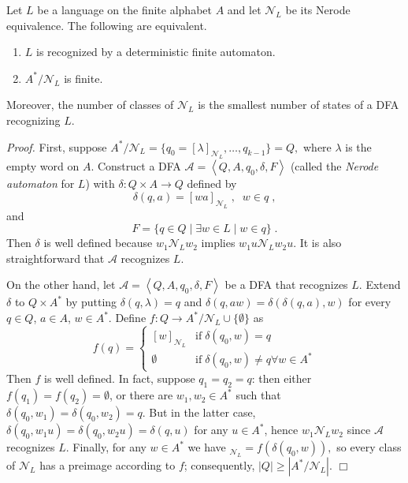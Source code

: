 \documentclass[12pt]{article}
\begin{document}
Let $L$ be a language on the finite alphabet $A$
and let $\mathcal{N}_L$ be its Nerode equivalence.
The following are equivalent.
\begin{enumerate}
\item
$L$ is recognized by a deterministic finite automaton.
\item
$A^\ast/\mathcal{N}_L$ is finite.
\end{enumerate}
Moreover, the number of classes of $\mathcal{N}_L$
is the smallest number of states of a DFA recognizing $L$.

\textit{Proof.}
First, suppose
\begin{math}
A^\ast/\mathcal{N}_L=\{q_0=[\lambda]_{\mathcal{N}_L},\ldots,q_{k-1}\}=Q,
\end{math}
where $\lambda$ is the empty word on $A$.
Construct a DFA $\mathcal{A}=\left<Q,A,q_0,\delta,F\right>$
(called the \emph{Nerode automaton} for $L$)
with $\delta:Q\times A\to Q$ defined by
\begin{equation} \label{eq:map}
\delta(q,a)=[wa]_{\mathcal{N}_L}\;,\;\;w\in q\;,
\end{equation}
and
\begin{equation} \label{eq:final}
F=\{q\in Q\mid\exists w\in L\mid w\in q\}\;.
\end{equation}
Then $\delta$ is well defined
because $w_1\mathcal{N}_Lw_2$ implies $w_1u\mathcal{N}_Lw_2u$.
It is also straightforward that $\mathcal{A}$ recognizes $L$.

On the other hand,
let $\mathcal{A}=\left<Q,A,q_0,\delta,F\right>$
be a DFA that recognizes $L$.
Extend $\delta$ to $Q\times A^\ast$ by putting
$\delta(q,\lambda)=q$ and
$\delta(q,aw)=\delta(\delta(q,a),w)$
for every $q\in Q$, $a\in A$, $w\in A^\ast$.
Define $f:Q\to A^\ast/\mathcal{N}_L\cup\{\emptyset\}$ as
\begin{equation} \label{eq:f}
f(q) = \left\{\begin{array}{ll}
[w]_{\mathcal{N}_L}
& \mathrm{if}\;\delta(q_0,w)=q \\
\emptyset
& \mathrm{if}\;\delta(q_0,w)\neq q\forall w\in A^\ast
\end{array}
\right.
\end{equation}
Then $f$ is well defined.
In fact, suppose $q_1=q_2=q$:
then either $f(q_1)=f(q_2)=\emptyset$,
or there are $w_1,w_2\in A^\ast$ such that $\delta(q_0,w_1)=\delta(q_0,w_2)=q$.
But in the latter case, $\delta(q_0,w_1u)=\delta(q_0,w_2u)=\delta(q,u)$
for any $u\in A^\ast$,
hence $w_1\mathcal{N}_Lw_2$ since $\mathcal{A}$ recognizes $L$.
Finally, for any $w\in A^\ast$ we have
\begin{math}
[w]_{\mathcal{N}_L}=f\left(\delta(q_0,w)\right),
\end{math}
so every class of $\mathcal{N}_L$ has a preimage according to $f$;
consequently, $|Q|\geq|A^\ast/\mathcal{N}_L|$.
\hfill$\Box$

\end{document}
